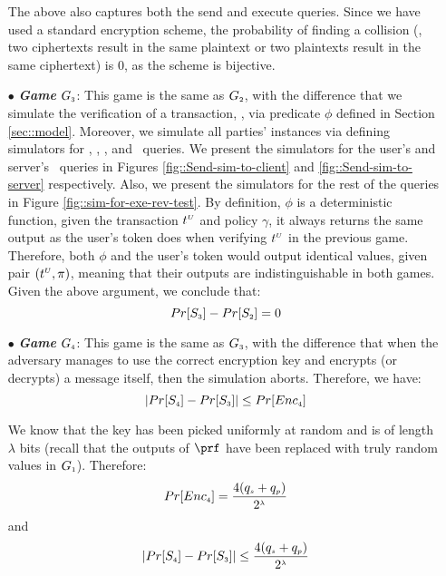 \begin{itemize}
The above also captures both the send and execute queries. Since we have used a standard encryption scheme, the probability of finding a collision (\eg, two ciphertexts result in the same plaintext or two plaintexts result in the same ciphertext) is $0$, as the scheme is bijective. 



\item[$\bullet$] \textit{\textbf{Game}}  $G_{\scriptscriptstyle  3}$: This game is the same as $G_{\scriptscriptstyle  2}$, with the difference that we simulate the verification of a transaction, \ie, via predicate $\phi$ defined in Section \ref{sec::model}. Moreover, we simulate all parties' instances via defining simulators for  \send, \execute, \reveal, and \test\ queries. We present the simulators for the user's and server's \send\ queries in Figures \ref{fig::Send-sim-to-client} and \ref{fig::Send-sim-to-server} respectively. Also, we present the simulators for the rest of the queries in Figure \ref{fig::sim-for-exe-rev-test}. By definition,  $\phi$ is a deterministic function, given the transaction $t^{\scriptscriptstyle  U}$ and policy $\gamma$, it always returns the same output as the user's token does when verifying $t^{\scriptscriptstyle  U}$ in the previous game.  Therefore, both $\phi$ and the user's token would output identical values, given pair $(t^{\scriptscriptstyle  U}, \pi)$, meaning that their outputs are indistinguishable in both games.  Given the above argument, we conclude that:  
%
\begin{equation}\label{eq::game_3}
Pr[S_{\scriptscriptstyle  3}]-Pr[S_{\scriptscriptstyle  2}]=0
\end{equation}
%
\item[$\bullet$] \textit{\textbf{Game}}  $G_{\scriptscriptstyle  4}$: This game is the same as $G_{\scriptscriptstyle  3}$, with the difference that when the adversary manages to use the correct encryption key and encrypts (or decrypts) a message itself, then the simulation aborts. Therefore, we have: 
%
\begin{equation*}
|Pr[S_{\scriptscriptstyle  4}]-Pr[S_{\scriptscriptstyle  3}]|\leq Pr[Enc_{\scriptscriptstyle  4}]
\end{equation*}


We know that the key has been picked uniformly at random and is of length $\lambda$ bits (recall that the outputs of $\prf$ have been replaced with truly random values in $G_{\scriptscriptstyle  1}$). Therefore:
%
 $$Pr[Enc_{\scriptscriptstyle  4}]=\frac{4(q_{\scriptscriptstyle  s}+q_{\scriptscriptstyle  p})}{2^{\scriptscriptstyle \lambda}}$$ and 
 \begin{equation}\label{eq::game_4}
 |Pr[S_{\scriptscriptstyle  4}]-Pr[S_{\scriptscriptstyle  3}]|\leq \frac{4(q_{\scriptscriptstyle  s}+q_{\scriptscriptstyle  p})}{2^{\scriptscriptstyle \lambda}}
 \end{equation}
%


\end{itemize}
